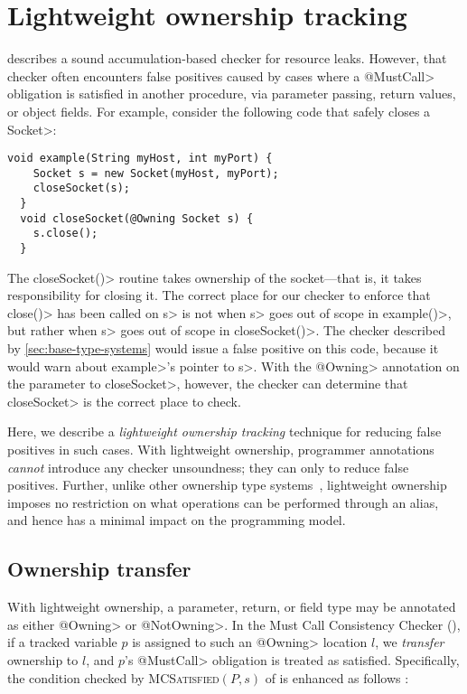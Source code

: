\section{Lightweight ownership tracking}
\label{sec:lightweight-ownership}

 describes a sound accumulation-based
checker for resource leaks. However, that checker often encounters false
positives caused by cases where a \<@MustCall> obligation is satisfied
in another procedure, via parameter passing, return values, or object fields.
For example, consider the following code that safely closes a \<Socket>:

\begin{lstlisting}[frame=tb,belowskip=3mm]
  void example(String myHost, int myPort) {
    Socket s = new Socket(myHost, myPort);
    closeSocket(s);
  }
  void closeSocket(@Owning Socket s) {
    s.close();
  }  
\end{lstlisting}

The \<closeSocket()> routine takes ownership of the socket---that is,
it takes responsibility for closing it. The correct place for our
checker to enforce that \<close()> has been called on \<s> is not
when \<s> goes out of scope in \<example()>, but rather when \<s>
goes out of scope in \<closeSocket()>. The checker described by
\cref{sec:base-type-systems} would issue a false positive on this
code, because it would warn about \<example>'s pointer to \<s>.
With the \<@Owning> annotation on the parameter to \<closeSocket>,
however, the checker can determine that \<closeSocket> is the correct
place to check.

Here, we describe a \emph{lightweight ownership tracking} technique for reducing
false positives in such cases.  With lightweight ownership, programmer
annotations \emph{cannot} introduce any checker unsoundness; they can only to
reduce false positives.  Further, unlike other ownership type systems~,
lightweight ownership imposes no restriction on what operations can be performed
through an alias, and hence has a minimal impact on the programming model.

\subsection{Ownership transfer}
\label{sec:ownership-transfer}

With lightweight ownership, a parameter, return, or field type may be annotated
as either \<@Owning> or \<@NotOwning>.  In
the Must Call Consistency Checker (), if a tracked
variable $p$ is assigned to such an \<@Owning> location $l$, we \emph{transfer}
ownership to $l$, and $p$'s \<@MustCall> obligation
is treated as satisfied. Specifically, the condition checked by
\textsc{MCSatisfied}$(P,s)$ of  is enhanced as follows
:

